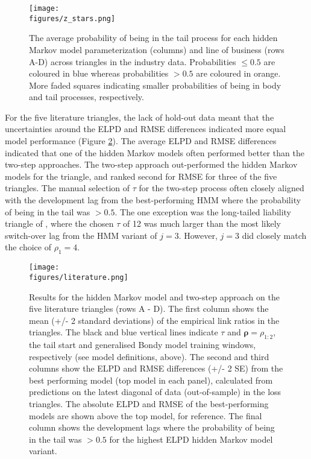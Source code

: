 \begin{figure}
    \centering
    \texttt{[image: \\figures/z\_stars.png]}
    \caption{
        The average probability of being in the tail process
        for each hidden Markov model parameterization (columns)
        and line of business (rows A-D) across triangles
        in the industry data.
        Probabilities $\leq 0.5$ are coloured
        in blue whereas probabilities $> 0.5$
        are coloured in orange. More faded squares
        indicating smaller probabilities of being
        in body and tail processes, respectively.
    }
    \label{fig:zstars}
\end{figure}

For the five literature triangles, the lack
of hold-out data meant that the uncertainties
around the ELPD and RMSE differences
indicated more equal model performance
(Figure \ref{fig:literature}).
The average ELPD and RMSE
differences indicated that one of the hidden
Markov models often performed better than the
two-step approaches. The two-step approach
out-performed the hidden Markov models
for the \cite{merz2015} triangle,
and ranked second for RMSE
for three of the five triangles.
The manual selection of $\tau$
for the two-step process often
closely aligned with the 
development lag from the
best-performing HMM where
the probability of being in
the tail was $> 0.5$. The one
exception was
the long-tailed
liability triangle of
\cite{balona2022},
where the chosen $\tau$
of 12 was much larger
than the most likely
switch-over lag from the HMM
variant of $j=3$. However,
$j=3$ did closely match
the choice of $\rho_{1} = 4$.

\begin{figure}
    \centering
    \hspace{-1em}
    \texttt{[image: \\figures/literature.png]}
    \caption{
        Results for the hidden Markov model and two-step
        approach on the five literature triangles
        (rows A - D). The first
        column shows the mean (+/- 2 standard deviations)
        of the empirical link ratios in the triangles.
        The black and blue vertical lines indicate $\tau$
        and $\bm{\rho} = \rho_{1:2}$, the tail start
        and generalised Bondy model training windows,
        respectively (see model definitions, above).
        The second and third columns show the
        ELPD and RMSE differences (+/- 2 SE) from the best
        performing model (top model in each panel), calculated
        from predictions on the latest diagonal of
        data (out-of-sample) in the loss triangles.
        The absolute ELPD and RMSE of the best-performing
        models are shown above the top model, for reference.
        The final column shows the development lags where
        the probability of being in the tail was $> 0.5$
        for the highest ELPD hidden Markov model
        variant.
    }
	\label{fig:literature}
\end{figure}

